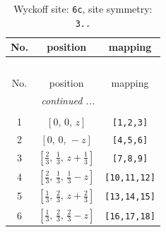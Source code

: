 \documentclass[fleqn,8pt]{jsarticle}
\begin{document}
\renewcommand{\arraystretch}{1.2}
\begin{longtable}{ccc}
\caption{Wyckoff site: {\tt 6c}, site symmetry: {\tt 3..}}
 \\
 \hline \hline
No. & position & mapping \\ \hline \endfirsthead

\multicolumn{2}{l}{\tablename\ \thetable{}} \\
 \hline \hline
No. & position & mapping \\ \hline \endhead

 \hline \hline
\multicolumn{2}{r}{\footnotesize\it continued ...} \\ \endfoot

 \hline \hline
\multicolumn{2}{r}{} \\ \endlastfoot

1 & $\left[ 0,\, 0,\, z \right]$ & {\tt [1,2,3]} \\ \hline
2 & $\left[ 0,\, 0,\, - z \right]$ & {\tt [4,5,6]} \\ \hline
3 & $\left[ \frac{2}{3},\, \frac{1}{3},\, z + \frac{1}{3} \right]$ & {\tt [7,8,9]} \\ \hline
4 & $\left[ \frac{2}{3},\, \frac{1}{3},\, \frac{1}{3} - z \right]$ & {\tt [10,11,12]} \\ \hline
5 & $\left[ \frac{1}{3},\, \frac{2}{3},\, z + \frac{2}{3} \right]$ & {\tt [13,14,15]} \\ \hline
6 & $\left[ \frac{1}{3},\, \frac{2}{3},\, \frac{2}{3} - z \right]$ & {\tt [16,17,18]} \\
\end{longtable}
\renewcommand{\arraystretch}{1.2}
\end{document}
